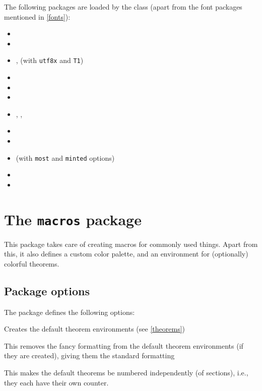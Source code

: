 \documentclass{notes}
\begin{document}
The following packages are loaded by the class (apart from the font packages mentioned in \ref{fonts}):
\begin{itemize}[nosep]
    \item {} 
    \item {}
    \item {},  (with \texttt{utf8x} and \texttt{T1})
    \item {}
    \item {}
    \item {}
    \item {}, , 
    \item {}
    \item {}
    \item {} (with \texttt{most} and \texttt{minted} options)
    \item {}
    \item {}
\end{itemize}

\section{The \texttt{macros} package}

This package takes care of creating macros for commonly used things. Apart from this, it also defines a custom color palette, and an environment for (optionally) colorful theorems.

\subsection{Package options}
The  package defines the following options:
\begin{description}[font=\ttfamily, labelindent=1em]
    \item[theorems] Creates the default theorem environments (see \ref{theorems})  
    \item[nofancy] This removes the fancy formatting from the default theorem environments (if they are created), giving them the standard  formatting  
    \item[numindep] This makes the default theorems be numbered independently (of sections), i.e., they each have their own counter.
\end{description}
\end{document}
